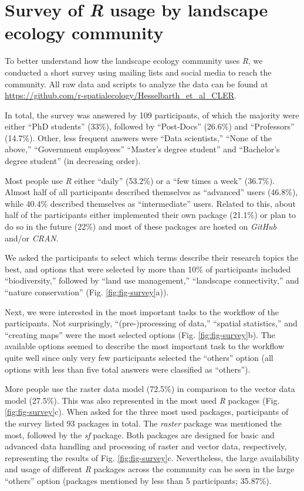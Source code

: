 \documentclass[smallextended]{svjour3}       %
\begin{document}
\FloatBarrier

\hypertarget{survey-of-r-usage-by-landscape-ecology-community}{%
\section{\texorpdfstring{Survey of \emph{R} usage by landscape ecology community}{Survey of R usage by landscape ecology community}}\label{survey-of-r-usage-by-landscape-ecology-community}}

To better understand how the landscape ecology community uses \emph{R}, we conducted a short survey using mailing lists and social media to reach the community.
All raw data and scripts to analyze the data can be found at \url{https://github.com/r-spatialecology/Hesselbarth_et_al_CLER}.

In total, the survey was answered by 109 participants, of which the majority were either ``PhD students'' (33\%), followed by ``Post-Docs'' (26.6\%) and ``Professors'' (14.7\%).
Other, less frequent answers were ``Data scientists,'' ``None of the above,'' ``Government employees'' ``Master's degree student'' and ``Bachelor's degree student'' (in decreasing order).

Most people use \emph{R} either ``daily'' (53.2\%) or a ``few times a week'' (36.7\%).
Almost half of all participants described themselves as ``advanced'' users (46.8\%), while 40.4\% described themselves as ``intermediate'' users.
Related to this, about half of the participants either implemented their own package (21.1\%) or plan to do so in the future (22\%) and most of these packages are hosted on \emph{GitHub} and/or \emph{CRAN}.

We asked the participants to select which terms describe their research topics the best, and options that were selected by more than 10\% of participants included ``biodiversity,'' followed by ``land use management,'' ``landscape connectivity,'' and ``nature conservation'' (Fig. \ref{fig:fig-survey}a)).

Next, we were interested in the most important tasks to the workflow of the participants.
Not surprisingly, ``(pre-)processing of data,'' ``spatial statistics,'' and ``creating maps'' were the most selected options (Fig. \ref{fig:fig-survey}b).
The available options seemed to describe the most important task to the workflow quite well since only very few participants selected the ``others'' option (all options with less than five total answers were classified as ``others'').

More people use the raster data model (72.5\%) in comparison to the vector data model (27.5\%).
This was also represented in the most used \emph{R} packages (Fig. \ref{fig:fig-survey}c).
When asked for the three most used packages, participants of the survey listed 93 packages in total.
The \emph{raster} package was mentioned the most, followed by the \emph{sf} package.
Both packages are designed for basic and advanced data handling and processing of raster and vector data, respectively, representing the results of Fig. \ref{fig:fig-survey}c.
Nevertheless, the large availability and usage of different \emph{R} packages across the community can be seen in the large ``others'' option (packages mentioned by less than 5 participants; 35.87\%).
\end{document}
